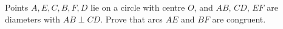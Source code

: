 Points $A,E,C,B,F,D$ lie on a circle with centre $O$, and $AB$, $CD$, $EF$ are diameters with $AB\perp CD$. Prove that arcs $AE$ and $BF$ are congruent.
